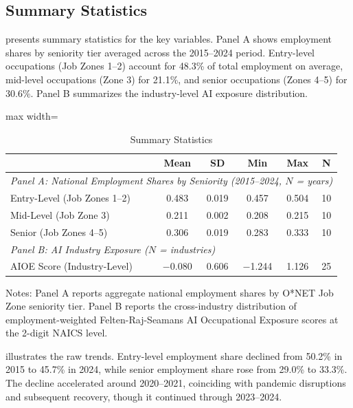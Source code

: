 \documentclass[12pt]{article}
\begin{document}
\subsection{Summary Statistics}

 presents summary statistics for the key variables. Panel A shows employment shares by seniority tier averaged across the 2015--2024 period. Entry-level occupations (Job Zones 1--2) account for 48.3\% of total employment on average, mid-level occupations (Zone 3) for 21.1\%, and senior occupations (Zones 4--5) for 30.6\%. Panel B summarizes the industry-level AI exposure distribution.

\begin{table}[H]
\centering
\caption{Summary Statistics}
\label{tab:summary}
\begin{threeparttable}
\begin{adjustbox}{max width=\textwidth}
\begin{tabular}{lccccc}
\toprule
 & Mean & SD & Min & Max & N \\
\midrule
\multicolumn{6}{l}{\textit{Panel A: National Employment Shares by Seniority (2015--2024, $N$ = years)}} \\
Entry-Level (Job Zones 1--2) & 0.483 & 0.019 & 0.457 & 0.504 & 10 \\
Mid-Level (Job Zone 3) & 0.211 & 0.002 & 0.208 & 0.215 & 10 \\
Senior (Job Zones 4--5) & 0.306 & 0.019 & 0.283 & 0.333 & 10 \\
\midrule
\multicolumn{6}{l}{\textit{Panel B: AI Industry Exposure ($N$ = industries)}} \\
AIOE Score (Industry-Level) & $-$0.080 & 0.606 & $-$1.244 & 1.126 & 25 \\
\bottomrule
\end{tabular}
\end{adjustbox}
\begin{tablenotes}[flushleft]
\small
\item Notes: Panel A reports aggregate national employment shares by O*NET Job Zone seniority tier. Panel B reports the cross-industry distribution of employment-weighted Felten-Raj-Seamans AI Occupational Exposure scores at the 2-digit NAICS level.
\end{tablenotes}
\end{threeparttable}
\end{table}

 illustrates the raw trends. Entry-level employment share declined from 50.2\% in 2015 to 45.7\% in 2024, while senior employment share rose from 29.0\% to 33.3\%. The decline accelerated around 2020--2021, coinciding with pandemic disruptions and subsequent recovery, though it continued through 2023--2024.
\end{document}
